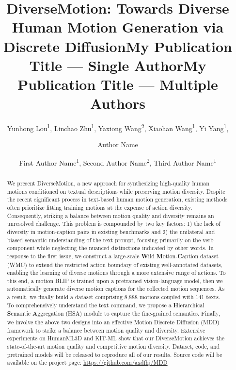 \documentclass[letterpaper]{article} \usepackage{aaai24}
\title{DiverseMotion: Towards Diverse Human Motion Generation via\\ Discrete Diffusion}
\author{
    Yunhong Lou\textsuperscript{\rm 1},
    Linchao Zhu\textsuperscript{\rm 1},
    Yaxiong Wang\textsuperscript{\rm 2},
    Xiaohan Wang\textsuperscript{\rm 1},
    Yi Yang\textsuperscript{\rm 1},
}
\title{My Publication Title --- Single Author}
\author {
    Author Name
}
\title{My Publication Title --- Multiple Authors}
\author {
First Author Name\textsuperscript{\rm 1},
    Second Author Name\textsuperscript{\rm 2},
    Third Author Name\textsuperscript{\rm 1}
}
\begin{document}
\maketitle

\begin{abstract}
We present DiverseMotion, a new approach for synthesizing high-quality human motions conditioned on textual descriptions while preserving motion diversity. 
Despite the recent significant process in text-based human motion generation,
existing methods often prioritize fitting training motions at the expense of action diversity. Consequently, striking a balance between motion quality and diversity remains an unresolved challenge. 
This problem is compounded by two key factors: 1) the lack of diversity in motion-caption pairs in existing benchmarks and 2) the unilateral and biased semantic understanding of the text prompt, focusing primarily on the verb component while neglecting the nuanced distinctions  indicated by other words.
In response to the first issue, we construct a large-scale \textbf{W}ild \textbf{M}otion-\textbf{C}aption  dataset (WMC) to extend the restricted action boundary of existing well-annotated datasets, enabling the learning of diverse motions through a more extensive range of actions. 
To this end, a motion BLIP is trained upon a pretrained vision-language model, then we automatically generate diverse motion captions for the collected motion sequences. As a result, we finally build a dataset comprising 8,888 motions coupled with 141 texts.
To comprehensively understand the text command, we propose a \textbf{H}ierarchical \textbf{S}emantic \textbf{A}ggregation (HSA) module to capture the fine-grained semantics.
Finally,
we involve the above two designs into an effective Motion Discrete Diffusion (MDD) framework  to strike a balance between motion quality and diversity. 
Extensive experiments on HumanML3D and KIT-ML show that our DiverseMotion achieves the state-of-the-art motion quality and competitive motion diversity. Dataset, code, and pretrained models will be released to reproduce all of our results.
Source code will be available on the project page: \url{https://github.com/axdfhj/MDD}







\end{abstract}
\end{document}
